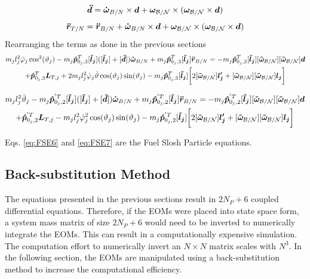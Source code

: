 \begin{equation}
	\bm{\ddot{d}}=\bm{\dot{\omega}}_{B/N}\times \bm{d}+\bm\omega_{\cal B/N}\times(\bm\omega_{\cal B/N}\times \bm{d})
\end{equation}
\begin{equation}
	\bm{\ddot{r}}_{T/N} = \bm{\ddot{r}}_{B/N} + \bm{\dot{\omega}}_{B/N}\times \bm{d}+\bm\omega_{\cal B/N}\times(\bm\omega_{\cal B/N}\times \bm{d})
\end{equation}
Rearranging the terms as done in the previous sections
\begin{multline}
	m_j l_j^2\ddot{\varphi}_j\cos^2(\vartheta_j) -m_{j} \bm{\hat{p}}_{0_j,3}^T [\bm{\tilde{l}_j}]([\bm{\tilde{l}_j}]+ [\bm{\tilde{d}}]) \bm{\dot{\omega}}_{B/N} +m_{j} \bm{\hat{p}}_{0_j,3}^{T} [\bm{\tilde{l}_j}] \bm{\ddot{r}}_{B/N} =-m_{j} \bm{\hat{p}}_{0_j,3}^{T} [\bm{\tilde{l}_j}][\bm{\tilde{\omega}}_{\cal B/N}][\bm{\tilde{\omega}}_{\cal B/N}] \bm{d}\\+\bm{\hat{p}}_{0_j,3}^T \bm{L}_{T,j}+2m_j l_j^2\dot{\varphi}_j\dot{\vartheta}\cos(\vartheta_j)\sin(\vartheta_j)- m_j \bm{\hat{p}}_{0_j,3}^T [\bm{\tilde{l}_j}]\bigg[2[\bm{\tilde{\omega}}_{\cal B/N}] \bm{l_j'}+[\bm{\tilde{\omega}}_{\cal B/N}][\bm{\tilde{\omega}}_{\cal B/N}] \bm{l_j}\bigg]
	\label{eq:FSE6}
\end{multline}

\begin{multline}
	m_j l_j^2\ddot{\vartheta}_j - m_{j}\bm{\hat{p}}_{0_j,2}^{'T} [\bm{\tilde{l}_j}]( [\bm{\tilde{l}_j}] + [\bm{\tilde{d}}])\bm{\dot{\omega}}_{B/N}
	+m_{j} \bm{\hat{p}}_{0_j,2}^{'T} [\bm{\tilde{l}_j}] \bm{\ddot{r}}_{B/N}
	=-m_{j} \bm{\hat{p}}_{0_j,2}^{'T}[\bm{\tilde{l}_j}][\bm{\tilde{\omega}}_{\cal B/N}][\bm{\tilde{\omega}}_{\cal B/N}] \bm{d}\\+\bm{\hat{p}}_{0_j,2}^{'T} \bm{L}_{T,j}-m_j l_j^2\dot{\varphi}_j^2\cos(\vartheta_j)\sin(\vartheta_j)- m_j \bm{\hat{p}}_{0_j,2}^{'T} [\bm{\tilde{l}_j}]\bigg[2[\bm{\tilde{\omega}}_{\cal B/N}] \bm{l_j'}+[\bm{\tilde{\omega}}_{\cal B/N}][\bm{\tilde{\omega}}_{\cal B/N}] \bm{l_j}\bigg]
	\label{eq:FSE7}
\end{multline}

Eqs. \eqref{eq:FSE6} and \eqref{eq:FSE7} are the Fuel Slosh Particle equations.


\subsection{Back-substitution Method}

The equations presented in the previous sections result in $2N_P + 6$ coupled differential equations. Therefore, if the EOMs were placed into state space form, a system mass matrix of size $2N_P + 6$ would need to be inverted to numerically integrate the EOMs. This can result in a computationally expensive simulation. The computation effort to numerically invert an $N\times N$ matrix scales with $N^{3}$. In the following section, the EOMs are manipulated using a back-substitution method to increase the computational efficiency. 

